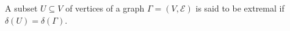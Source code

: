 A subset $U \subseteq V$ of vertices of a graph $\Gamma = (V, \mathcal{E})$ is said to be extremal if $\delta(U) = \delta(\Gamma)$.
